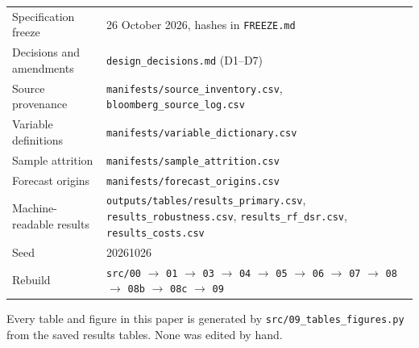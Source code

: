 \documentclass[11pt,a4paper]{article}
\begin{document}
\begin{table}[htbp]
\centering
\small
\begin{tabular}{ll}
\toprule
Specification freeze     & 26 October 2026, hashes in \texttt{FREEZE.md} \\
Decisions and amendments & \texttt{design\_decisions.md} (D1--D7) \\
Source provenance        & \texttt{manifests/source\_inventory.csv}, \texttt{bloomberg\_source\_log.csv} \\
Variable definitions     & \texttt{manifests/variable\_dictionary.csv} \\
Sample attrition         & \texttt{manifests/sample\_attrition.csv} \\
Forecast origins         & \texttt{manifests/forecast\_origins.csv} \\
Machine-readable results & \texttt{outputs/tables/results\_primary.csv}, \texttt{results\_robustness.csv}, \texttt{results\_rf\_dsr.csv}, \texttt{results\_costs.csv} \\
Seed                     & 20261026 \\
Rebuild                  & \texttt{src/00} $\to$ \texttt{01} $\to$ \texttt{03} $\to$ \texttt{04} $\to$ \texttt{05} $\to$ \texttt{06} $\to$ \texttt{07} $\to$ \texttt{08} $\to$ \texttt{08b} $\to$ \texttt{08c} $\to$ \texttt{09} \\
\bottomrule
\end{tabular}
\end{table}

Every table and figure in this paper is generated by
\texttt{src/09\_tables\_figures.py} from the saved results tables. None was
edited by hand.
\end{document}
